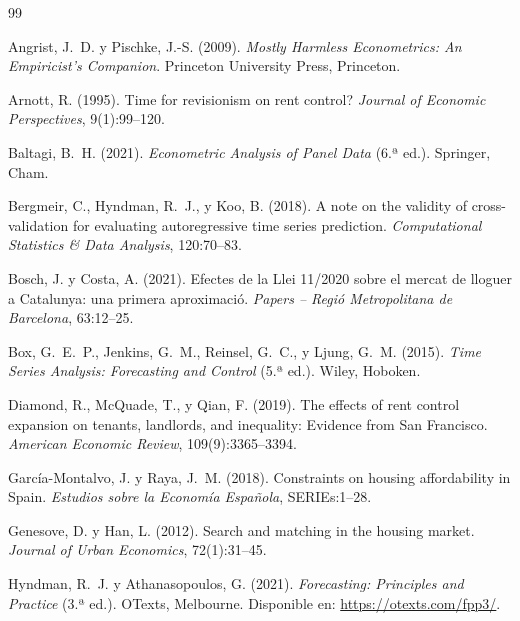 \documentclass[12pt,a4paper]{article}
\begin{document}

\begin{thebibliography}{99}

Angrist, J.~D. y Pischke, J.-S. (2009).
\newblock \textit{Mostly Harmless Econometrics: An Empiricist's Companion}.
\newblock Princeton University Press, Princeton.

Arnott, R. (1995).
\newblock Time for revisionism on rent control?
\newblock \textit{Journal of Economic Perspectives}, 9(1):99--120.

Baltagi, B.~H. (2021).
\newblock \textit{Econometric Analysis of Panel Data} (6.ª ed.).
\newblock Springer, Cham.

Bergmeir, C., Hyndman, R.~J., y Koo, B. (2018).
\newblock A note on the validity of cross-validation for evaluating autoregressive
  time series prediction.
\newblock \textit{Computational Statistics \& Data Analysis}, 120:70--83.

Bosch, J. y Costa, A. (2021).
\newblock Efectes de la Llei 11/2020 sobre el mercat de lloguer a Catalunya:
  una primera aproximació.
\newblock \textit{Papers -- Regió Metropolitana de Barcelona}, 63:12--25.

Box, G.~E.~P., Jenkins, G.~M., Reinsel, G.~C., y Ljung, G.~M. (2015).
\newblock \textit{Time Series Analysis: Forecasting and Control} (5.ª ed.).
\newblock Wiley, Hoboken.

Diamond, R., McQuade, T., y Qian, F. (2019).
\newblock The effects of rent control expansion on tenants, landlords, and inequality:
  Evidence from San Francisco.
\newblock \textit{American Economic Review}, 109(9):3365--3394.

García-Montalvo, J. y Raya, J.~M. (2018).
\newblock Constraints on housing affordability in Spain.
\newblock \textit{Estudios sobre la Economía Española}, SERIEs:1--28.

Genesove, D. y Han, L. (2012).
\newblock Search and matching in the housing market.
\newblock \textit{Journal of Urban Economics}, 72(1):31--45.

Hyndman, R.~J. y Athanasopoulos, G. (2021).
\newblock \textit{Forecasting: Principles and Practice} (3.ª ed.).
\newblock OTexts, Melbourne.
\newblock Disponible en: \url{https://otexts.com/fpp3/}.


\end{thebibliography}
\end{document}
